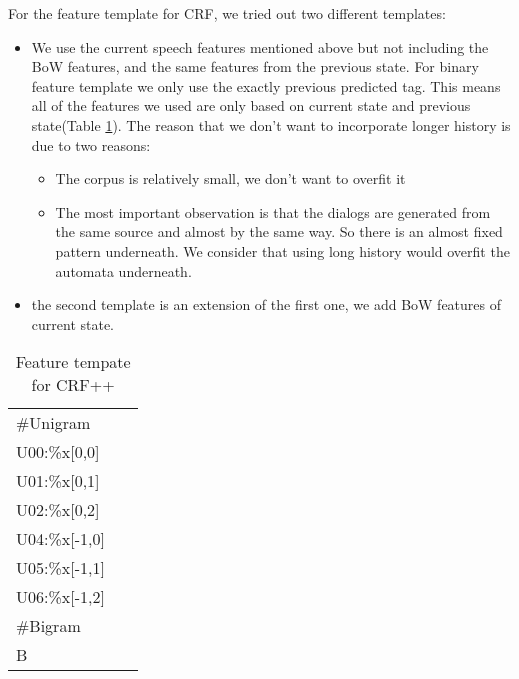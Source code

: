 \documentclass[a4paper]{article}
\begin{document}
For the feature template for CRF, we tried out two different templates:
\begin{itemize}
    \item We use the current speech features mentioned above but not including the BoW features, and the same features from the previous state. For binary feature template we only use the exactly previous predicted tag. This means all of the features we used are only based on current state and previous state(Table \ref{table:feature}). The reason that we don't want to incorporate longer history is due to two reasons:
        \begin{itemize}
            \item The corpus is relatively small, we don't want to overfit it
            \item The most important observation is that the dialogs are generated from the same source and almost by the same way. So there is an almost fixed pattern underneath. We consider that using long history would overfit the automata underneath.
        \end{itemize}
    \item the second template is an extension of the first one, we add BoW features of current state.
\end{itemize}
\begin{table}
    \begin{center}
    \begin{tabular}{|l|}
    \hline
    \#Unigram      \\ 
    U00:\%x[0,0]  \\ 
    U01:\%x[0,1]  \\ 
    U02:\%x[0,2]  \\ 
    U04:\%x[-1,0] \\ 
    U05:\%x[-1,1] \\ 
    U06:\%x[-1,2] \\ 
    \#Bigram       \\
    B\\
    \hline
    \end{tabular}
    \caption{Feature tempate for CRF++}
    \label{table:feature}
    \end{center}
\end{table}
\end{document}
